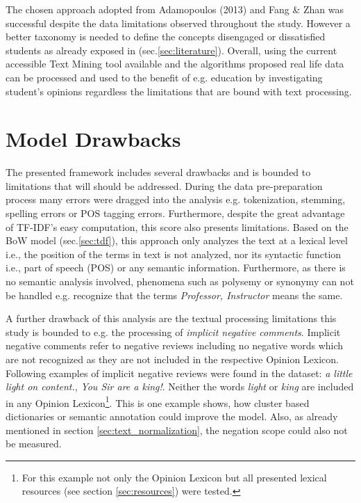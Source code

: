 \documentclass[
	a4paper,
	pdftex,
	12pt,	
	footinclude=true,
	fleqn,
	final,
	]{report}%
\begin{document}
The chosen approach adopted from Adamopoulos (2013) and Fang \& Zhan
was successful despite the data limitations observed throughout the study.
However a better taxonomy is needed to define the concepts disengaged or
dissatisfied students as already exposed in (sec.\ref{sec:literature}).
Overall, using the current accessible Text Mining tool available and the 
algorithms proposed real life data can be processed and used to the 
benefit of e.g. education by investigating student's opinions regardless the 
limitations that are bound with text processing.
\vspace{-0.45cm}
\section*{Model Drawbacks} %
\label{sec:drawbacks}
\vspace{-0.3cm}
The presented framework includes several drawbacks and is bounded to 
limitations that will should be addressed. During the data pre-preparation
process many errors were dragged into the analysis e.g. 
tokenization, stemming, spelling errors or POS tagging errors.
Furthermore, despite the great advantage of TF-IDF's
easy computation, this score also presents limitations.
Based on the BoW model (sec.\ref{sec:tdf}), this approach only analyzes
the text at a lexical level i.e., 
the position of the terms in text is not analyzed, nor its 
syntactic function i.e., part of speech (POS) or any semantic 
information. Furthermore, as there is no semantic analysis involved,
phenomena such as polysemy or synonymy can not be handled e.g. 
recognize that the terms \emph{Professor, Instructor} 
means the same. 

A further drawback of this analysis are the textual processing
limitations this study is bounded to e.g. the processing of 
\emph{implicit negative comments}\cite{Fang2015}.
Implicit negative comments refer to negative reviews including 
no negative words which are not recognized as they are not 
included in the respective Opinion Lexicon. 
Following examples of implicit negative reviews were found in the dataset:
\emph{a little light on content.}, \emph{You Sir are a king!}. 
Neither the words \emph{light} or \emph{king} are included in any
Opinion Lexicon\footnote{
For this example not only the Opinion Lexicon but all presented lexical resources (see section \ref{sec:resources}) were tested.}. 
This is one example shows, how cluster based dictionaries or semantic annotation 
could improve the model. Also, as already mentioned in section \ref{sec:text_normalization}, 
the negation scope could also not be measured.
\end{document}
